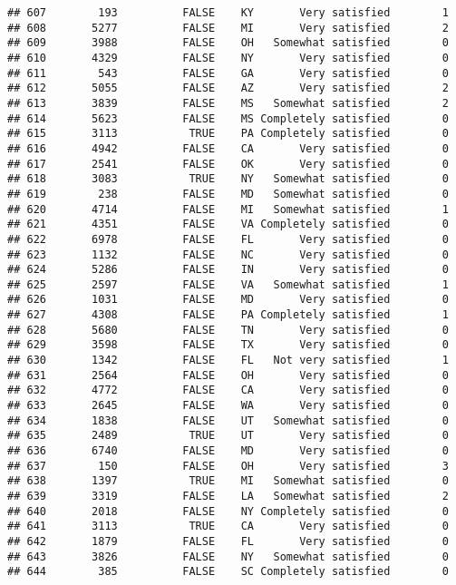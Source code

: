 \documentclass[]{book}
\theoremstyle{definition}
\theoremstyle{definition}
\theoremstyle{remark}
\begin{document}
\begin{verbatim}
## 607        193          FALSE    KY       Very satisfied        1
## 608       5277          FALSE    MI       Very satisfied        2
## 609       3988          FALSE    OH   Somewhat satisfied        0
## 610       4329          FALSE    NY       Very satisfied        0
## 611        543          FALSE    GA       Very satisfied        0
## 612       5055          FALSE    AZ       Very satisfied        2
## 613       3839          FALSE    MS   Somewhat satisfied        2
## 614       5623          FALSE    MS Completely satisfied        0
## 615       3113           TRUE    PA Completely satisfied        0
## 616       4942          FALSE    CA       Very satisfied        0
## 617       2541          FALSE    OK       Very satisfied        0
## 618       3083           TRUE    NY   Somewhat satisfied        0
## 619        238          FALSE    MD   Somewhat satisfied        0
## 620       4714          FALSE    MI   Somewhat satisfied        1
## 621       4351          FALSE    VA Completely satisfied        0
## 622       6978          FALSE    FL       Very satisfied        0
## 623       1132          FALSE    NC       Very satisfied        0
## 624       5286          FALSE    IN       Very satisfied        0
## 625       2597          FALSE    VA   Somewhat satisfied        1
## 626       1031          FALSE    MD       Very satisfied        0
## 627       4308          FALSE    PA Completely satisfied        1
## 628       5680          FALSE    TN       Very satisfied        0
## 629       3598          FALSE    TX       Very satisfied        0
## 630       1342          FALSE    FL   Not very satisfied        1
## 631       2564          FALSE    OH       Very satisfied        0
## 632       4772          FALSE    CA       Very satisfied        0
## 633       2645          FALSE    WA       Very satisfied        0
## 634       1838          FALSE    UT   Somewhat satisfied        0
## 635       2489           TRUE    UT       Very satisfied        0
## 636       6740          FALSE    MD       Very satisfied        0
## 637        150          FALSE    OH       Very satisfied        3
## 638       1397           TRUE    MI   Somewhat satisfied        0
## 639       3319          FALSE    LA   Somewhat satisfied        2
## 640       2018          FALSE    NY Completely satisfied        0
## 641       3113           TRUE    CA       Very satisfied        0
## 642       1879          FALSE    FL       Very satisfied        0
## 643       3826          FALSE    NY   Somewhat satisfied        0
## 644        385          FALSE    SC Completely satisfied        0

\end{verbatim}
\end{document}
